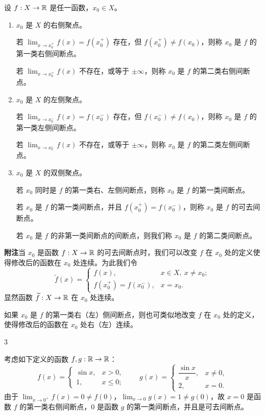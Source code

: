 \begin{mydef*}{}

	设 \(f:X\to\mathbb{R}\) 是任一函数，\(x_0\in X\)。

	\begin{enumerate}[label=\arabic*)]
		\item \(x_0\) 是 \(X\) 的右侧聚点。

		若 \(\lim_{x\to x_0^+}f(x)=f(x_0^+)\) 存在，但 \(f(x_0^+)\neq f(x_0)\)，则称 \(x_0\) 是 \(f\) 的第一类右侧间断点。

		若 \(\lim_{x\to x_0^+}f(x)\) 不存在，或等于 \(\pm\infty\)，则称 \(x_0\) 是 \(f\) 的第二类右侧间断点。

		\item \(x_0\) 是 \(X\) 的左侧聚点。

		若 \(\lim_{x\to x_0^-}f(x)=f(x_0^-)\) 存在，但 \(f(x_0^-)\neq f(x_0)\)，则称 \(x_0\) 是 \(f\) 的第一类左侧间断点。

		若 \(\lim_{x\to x_0^-}f(x)\) 不存在，或等于 \(\pm\infty\)，则称 \(x_0\) 是 \(f\) 的第二类左侧间断点。

		\item \(x_0\) 是 \(X\) 的双侧聚点。

		若 \(x_0\) 同时是 \(f\) 的第一类右、左侧间断点，则称 \(x_0\) 是 \(f\) 的第一类间断点。

		若 \(x_0\) 是 \(f\) 的第一类间断点，并且 \(f(x_0^+)=f(x_0^-)\)，则称 \(x_0\) 是 \(f\) 的可去间断点。

		若 \(x_0\) 是 \(f\) 的非第一类间断点的间断点，则我们称 \(x_0\) 是 \(f\) 的第二类间断点。
	\end{enumerate}

\end{mydef*}

\textbf{附注}\quad 当 \(x_0\) 是函数 \(f:X\to\mathbb{R}\) 的可去间断点时，我们可以改变 \(f\) 在 \(x_0\) 处的定义使得修改后的函数在 \(x_0\) 处连续。为此我们令
\[
\widetilde f(x)=\begin{cases} f(x), & x\in X,\ x\neq x_0; \\ f(x_0^+)=f(x_0^-), & x=x_0. \end{cases}
\]
显然函数 \(\widetilde f:X\to\mathbb{R}\) 在 \(x_0\) 处连续。

如果 \(x_0\) 是 \(f\) 的第一类右（左）侧间断点，则也可类似地改变 \(f\) 在 \(x_0\) 处的定义，使得修改后的函数在 \(x_0\) 处右（左）连续。

\begin{sourceexample}{3}

	考虑如下定义的函数 \(f,g:\mathbb{R}\to\mathbb{R}\)：
	\[
	f(x)=\begin{cases} \sin x, & x>0, \\ 1, & x\le0; \end{cases}
	\qquad
	g(x)=\begin{cases} \dfrac{\sin x}{x}, & x\neq0, \\ 2, & x=0. \end{cases}
	\]
	由于 \(\lim_{x\to0^+}f(x)=0\neq f(0)\)，\(\lim_{x\to0}g(x)=1\neq g(0)\)，故 \(x=0\) 是函数 \(f\) 的第一类右侧间断点，\(0\) 是函数 \(g\) 的第一类间断点，并且是可去间断点。

\end{sourceexample}


